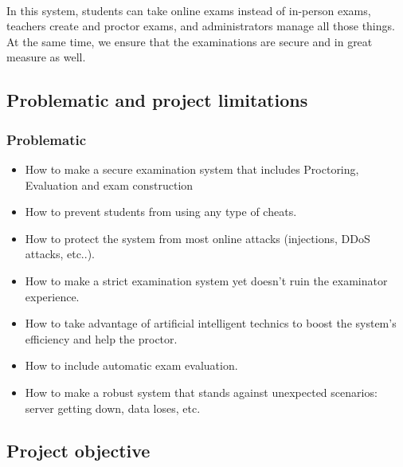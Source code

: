 \documentclass[]{uc2pfecaneva}
\begin{document}
    \paragraph{}
    In this system, students can take online exams instead of in-person exams, teachers create and proctor exams, and administrators manage all those things. At the same time, we ensure that the examinations are secure and in great measure as well.

    \subsection{Problematic and project limitations}
    \subsubsection{Problematic}

    \begin{itemize}
        \item How to make a secure examination system that includes Proctoring, Evaluation and exam construction
        \item How to prevent students from using any type of cheats.
        \item How to protect the system from most online attacks (injections, DDoS attacks, etc..).
        \item How to make a strict examination system yet doesn't ruin the examinator experience.
        \item How to take advantage of artificial intelligent technics to boost the system’s efficiency and help the proctor.
        \item How to include automatic exam evaluation.
        \item How to make a robust system that stands against unexpected scenarios: server getting down, data loses, etc.
    \end{itemize}



    \subsection{Project objective}
\end{document}
